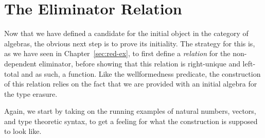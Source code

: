 \section{The Eliminator Relation}\label{sec:red-r}

Now that we have defined a candidate for the initial object in the category of
algebras,
the obvious next step is to prove its initiality.
The strategy for this is, as we have seen in Chapter~\ref{sec:red-ex},
to first define a \emph{relation} for the non-dependent eliminator, before showing
that this relation is right-unique and left-total and as such, a function.
Like the wellformedness predicate, the construction of this relation
relies on the fact that we are provided with an initial algebra for the type
erasure.

Again, we start by taking on the running examples of natural numbers, vectors,
and type theoretic syntax, to get a feeling for what the construction is supposed
to look like.

